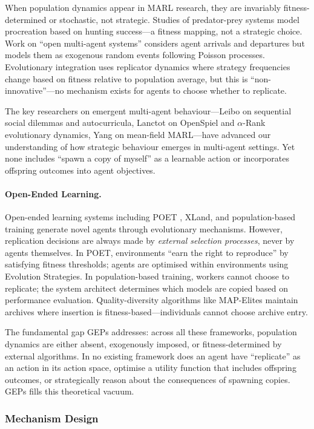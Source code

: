 \documentclass[12pt]{article}
\begin{document}
When population dynamics appear in MARL research, they are invariably fitness-determined or stochastic, not strategic. Studies of predator-prey systems model procreation based on hunting success---a fitness mapping, not a strategic choice. Work on ``open multi-agent systems'' considers agent arrivals and departures but models them as exogenous random events following Poisson processes. Evolutionary integration uses replicator dynamics where strategy frequencies change based on fitness relative to population average, but this is ``non-innovative''---no mechanism exists for agents to choose whether to replicate.

The key researchers on emergent multi-agent behaviour---Leibo on sequential social dilemmas and autocurricula, Lanctot on OpenSpiel and $\alpha$-Rank evolutionary dynamics, Yang on mean-field MARL---have advanced our understanding of how strategic behaviour emerges in multi-agent settings. Yet none includes ``spawn a copy of myself'' as a learnable action or incorporates offspring outcomes into agent objectives.

\paragraph{Open-Ended Learning.}
Open-ended learning systems including POET \citep{wang2019}, XLand, and population-based training generate novel agents through evolutionary mechanisms. However, replication decisions are always made by \emph{external selection processes}, never by agents themselves. In POET, environments ``earn the right to reproduce'' by satisfying fitness thresholds; agents are optimised within environments using Evolution Strategies. In population-based training, workers cannot choose to replicate; the system architect determines which models are copied based on performance evaluation. Quality-diversity algorithms like MAP-Elites maintain archives where insertion is fitness-based---individuals cannot choose archive entry.

The fundamental gap GEPs addresses: across all these frameworks, population dynamics are either absent, exogenously imposed, or fitness-determined by external algorithms. In no existing framework does an agent have ``replicate'' as an action in its action space, optimise a utility function that includes offspring outcomes, or strategically reason about the consequences of spawning copies. GEPs fills this theoretical vacuum.

\subsubsection{Mechanism Design}
\end{document}
